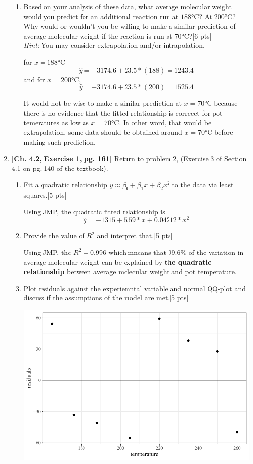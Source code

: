 \documentclass[11pt]{article}\usepackage[]{graphicx}\usepackage[]{color}
\begin{document}
\begin{enumerate}
\begin{enumerate}
    \item Based on your analysis of these data, what average molecular weight would you predict for an additional reaction run at $188$°C? At $200$°C? Why would or wouldn't you be willing to make a similar prediction of average molecular weight if the reaction is run at $70$°C?[6 pts]\\
    \emph{Hint:} You may consider extrapolation and/or intrapolation.
	
	for $x= 188$°C 
	$$\hat{y}= -3174.6 +23.5 * (188)= 1243.4 $$
	and for $x= 200$°C, 
	$$\hat{y}= -3174.6 +23.5 * (200)= 1525.4$$
	
	It would not be wise to make a similar prediction at $x=70$°C because there is no evidence that the fitted relationship is correect for pot temeratures as low as $x=70$°C. In other word, that would be extrapolation. some data should be obtained around $x=70$°C before making such prediction. 
	\end{enumerate}

	
	\item  \textbf{[Ch. 4.2, Exercise 1, pg. 161]} Return to problem 2, (Exercise 3 of Section 4.1 on pg. 140 of the textbook). 
	\begin{enumerate}
	
	  \item Fit a quadratic relationship $y \approx \beta_0 + \beta_1 x + \beta_2 x^2$ to the data via least squares.[5 pts] 
	  

	  Using JMP, the quadratic fitted relationship is
	  $$\hat{y}= -1315 + 5.59*x +0.04212*x^2 $$
	  \item Provide the value of $R^2$ and interpret that.[5 pts]
	  
	  Using JMP, the $R^2 = 0.996$ which mneans that 99.6\% of the variation in average molecular weight can be explained by \textbf{the quadratic relationship} between average molecular weight and pot temperature. 
	  
	  \item Plot residuals against the experiemntal variable and normal QQ-plot and discuss if the assumptions of the model are met.[5 pts]
	  
	  
\includegraphics{stat305-hw4_sol-009}



\end{enumerate}
\end{enumerate}
\end{document}
